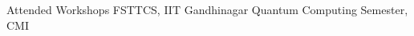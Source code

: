 \begin{rubric}{Attended Workshops}
\entry*[2024] FSTTCS, IIT Gandhinagar
 Quantum Computing Semester, CMI
\end{rubric}